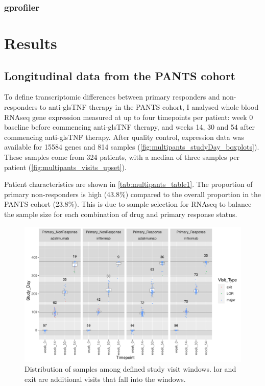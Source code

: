 \begin{outline}
\subsubsection{gprofiler}

\section{Results}

\subsection{Longitudinal  data from the \gls{PANTS} cohort}

To define transcriptomic differences between primary responders and non-responders to anti-gls{TNF} therapy in the \gls{PANTS} cohort, 
I analysed whole blood \gls{RNAseq} gene expression measured at up to four timepoints per patient:
week 0 baseline before commencing anti-gls{TNF} therapy, and weeks 14, 30 and 54 after commencing anti-gls{TNF} therapy.
After quality control, expression data was available for 15584 genes and 814 samples (\autoref{fig:multipants_studyDay_boxplots}).
These samples come from 324 patients, with a median of three samples per patient (\autoref{fig:multipants_visits_upset}).

Patient characteristics are shown in \autoref{tab:multipants_table1}. 
The proportion of primary non-responders is high (43.8\%) compared to the overall proportion in the \gls{PANTS} cohort (23.8\%)\autocite{kennedy2019PredictorsAntiTNFTreatment}.
This is due to sample selection for \gls{RNAseq} to balance the sample size for each combination of drug and primary response status.

\begin{figure}
    \centering
    \includegraphics[width=1.0\textwidth,page=1]{mainmatter/figures/chapter_04/process_pheno.pheno_filtered_dge.Study_Day_vs_Visit_Label.pdf}
    \caption{Distribution of samples among defined study visit windows. lor and exit are additional visits that fall into the windows.}
    \label{fig:multipants_studyDay_boxplots}
\end{figure}


\end{outline}
